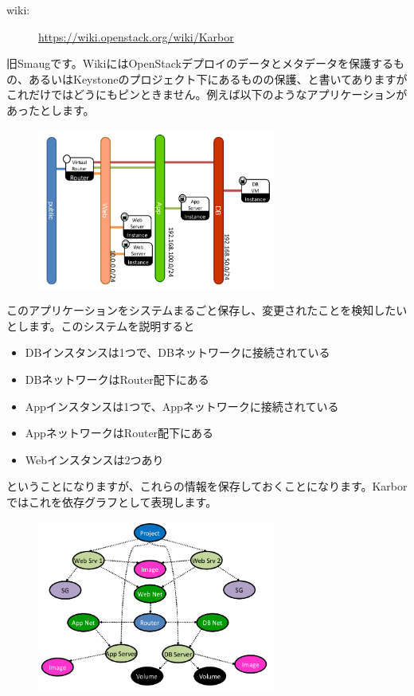 \begin{description}
	\item[wiki:] \url{https://wiki.openstack.org/wiki/Karbor}
\end{description}

旧Smaugです。WikiにはOpenStackデプロイのデータとメタデータを保護するもの、あるいはKeystoneのプロジェクト下にあるものの保護、と書いてありますがこれだけではどうにもピンときません。例えば以下のようなアプリケーションがあったとします。

\begin{figure}[htb]
	\begin{center}
		\includegraphics[width=0.7\textwidth]{img/Smaug-sample-application.png}
	\end{center}
\end{figure}

このアプリケーションをシステムまるごと保存し、変更されたことを検知したいとします。このシステムを説明すると

\begin{itemize}
	\item DBインスタンスは1つで、DBネットワークに接続されている
	\item DBネットワークはRouter配下にある
	\item Appインスタンスは1つで、Appネットワークに接続されている
	\item AppネットワークはRouter配下にある
	\item Webインスタンスは2つあり
\end{itemize}

ということになりますが、これらの情報を保存しておくことになります。Karborではこれを依存グラフとして表現します。

\begin{figure}[htb]
	\begin{center}
		\includegraphics[width=0.7\textwidth]{img/Smaug-dependency-graph.png}
	\end{center}
\end{figure}

